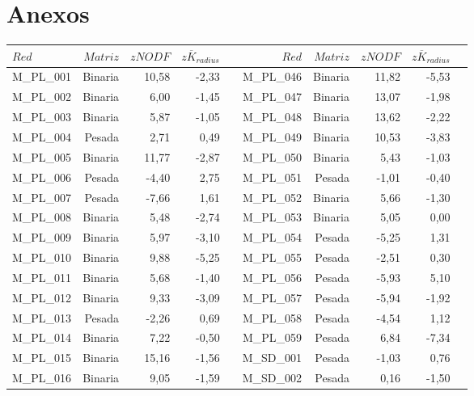 \section{Anexos}
\label{ESTATICA_ANEXO}
\begin{table}[ht!]
\fontsize{2.2mm}{2.2mm}\selectfont
  \centering
    \begin{tabular}{lrrrrrrrrr}
    \toprule
    $Red$  & $Matriz$ & $zNODF$ & $z\overline K_{radius}$ &  &  $Red$  & $Matriz$ & $zNODF$ & $z\overline K_{radius}$ \\
    \midrule
    M\_PL\_001 & Binaria & 10,58 & -2,33 &      & M\_PL\_046 & Binaria & 11,82 & -5,53 \\
    M\_PL\_002 & Binaria & 6,00 & -1,45 &      & M\_PL\_047 & Binaria & 13,07 & -1,98 \\
    M\_PL\_003 & Binaria & 5,87 & -1,05 &      & M\_PL\_048 & Binaria & 13,62 & -2,22 \\
    M\_PL\_004 & Pesada & 2,71 & 0,49 &      & M\_PL\_049 & Binaria & 10,53 & -3,83 \\
    M\_PL\_005 & Binaria & 11,77 & -2,87 &      & M\_PL\_050 & Binaria & 5,43 & -1,03 \\
    M\_PL\_006 & Pesada & -4,40 & 2,75 &      & M\_PL\_051 & Pesada & -1,01 & -0,40 \\
    M\_PL\_007 & Pesada & -7,66 & 1,61 &      & M\_PL\_052 & Binaria & 5,66 & -1,30 \\
    M\_PL\_008 & Binaria & 5,48 & -2,74 &      & M\_PL\_053 & Binaria & 5,05 & 0,00 \\
    M\_PL\_009 & Binaria & 5,97 & -3,10 &      & M\_PL\_054 & Pesada & -5,25 & 1,31 \\
    M\_PL\_010 & Binaria & 9,88 & -5,25 &      & M\_PL\_055 & Pesada & -2,51 & 0,30 \\
    M\_PL\_011 & Binaria & 5,68 & -1,40 &      & M\_PL\_056 & Pesada & -5,93 & 5,10 \\
    M\_PL\_012 & Binaria & 9,33 & -3,09 &      & M\_PL\_057 & Pesada & -5,94 & -1,92 \\
    M\_PL\_013 & Pesada & -2,26 & 0,69 &      & M\_PL\_058 & Pesada & -4,54 & 1,12 \\
    M\_PL\_014 & Binaria & 7,22 & -0,50 &      & M\_PL\_059 & Pesada & 6,84 & -7,34 \\
    M\_PL\_015 & Binaria & 15,16 & -1,56 &      & M\_SD\_001 & Pesada & -1,03 & 0,76 \\
    M\_PL\_016 & Binaria & 9,05 & -1,59 &      & M\_SD\_002 & Pesada & 0,16 & -1,50 \\

\end{tabular}
\end{table}

